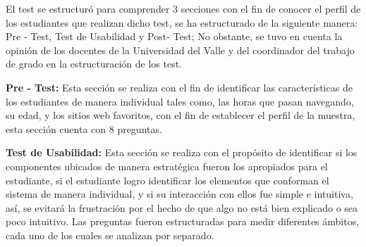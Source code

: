 El test se estructuró para comprender 3 secciones con el fin de conocer el perfil de los estudiantes que realizan dicho test, se ha estructurado de la siguiente manera: Pre - Test, Test de Usabilidad y Post- Test; No obstante, se tuvo en cuenta la opinión de los docentes de la Universidad del Valle y del coordinador del trabajo de grado en la estructuración de los test.

\textbf{Pre - Test:} Esta sección se realiza con el fin de identificar las características de los estudiantes de manera individual tales como, las horas que pasan navegando, su edad, y los sitios web favoritos, con el fin de establecer el perfil de la muestra, esta sección cuenta con 8 preguntas.

\textbf{Test de Usabilidad:} Esta sección se realiza con el propósito de identificar si los componentes ubicados de manera estratégica fueron los apropiados para el estudiante, si el estudiante logro identificar los elementos que conforman el sistema de manera individual, y si su interacción con ellos fue simple e intuitiva, así, se evitará la frustración por el hecho de que algo no está bien explicado o sea poco intuitivo. Las preguntas fueron estructuradas para medir diferentes ámbitos, cada uno de los cuales se analizan por separado.

